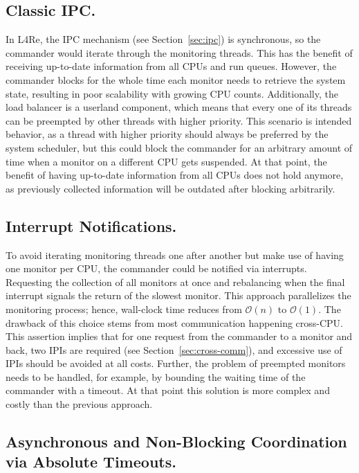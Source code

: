 \subsection{Classic IPC.}

In L4Re, the IPC mechanism (see Section~\ref{sec:ipc}) is synchronous, so the commander would iterate through the monitoring threads.
This has the benefit of receiving up-to-date information from all CPUs and run queues.
However, the commander blocks for the whole time each monitor needs to retrieve the system state, resulting in poor scalability with growing CPU counts.
Additionally, the load balancer is a userland component, which means that every one of its threads can be preempted by other threads with higher priority.
This scenario is intended behavior, as a thread with higher priority should always be preferred by the system scheduler, but this could block the commander for an arbitrary amount of time when a monitor on a different CPU gets suspended.
At that point, the benefit of having up-to-date information from all CPUs does not hold anymore, as previously collected information will be outdated after blocking arbitrarily.

\subsection{Interrupt Notifications.}

To avoid iterating monitoring threads one after another but make use of having one monitor per CPU, the commander could be notified via interrupts.
Requesting the collection of all monitors at once and rebalancing when the final interrupt signals the return of the slowest monitor.
This approach parallelizes the monitoring process; hence, wall-clock time reduces from $\mathcal{O}(n)$ to $\mathcal{O}(1)$.
The drawback of this choice stems from most communication happening cross-CPU.
This assertion implies that for one request from the commander to a monitor and back, two IPIs are required (see Section~\ref{sec:cross-comm}), and excessive use of IPIs should be avoided at all costs.
Further, the problem of preempted monitors needs to be handled, for example, by bounding the waiting time of the commander with a timeout.
At that point this solution is more complex and costly than the previous approach.

\subsection{Asynchronous and Non-Blocking Coordination via Absolute Timeouts.}
\label{sec:abs-timeouts}

